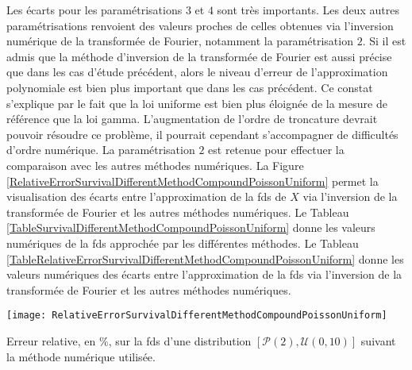 Les écarts pour les paramétrisations $3$ et $4$ sont très importants. Les deux autres paramétrisations renvoient des valeurs proches de celles obtenues via l\rq{}inversion numérique de la transformée de Fourier, notamment la paramétrisation $2$. Si il est admis que la méthode d\rq{}inversion de la transformée de Fourier est aussi précise que dans les cas d\rq{}étude précédent, alors le niveau d\rq{}erreur de l\rq{}approximation polynomiale est bien plus important que dans les cas précédent. Ce constat s\rq{}explique par le fait que la loi uniforme est bien plus éloignée de la mesure de référence que la loi gamma. L\rq{}augmentation de l\rq{}ordre de troncature devrait pouvoir résoudre ce problème, il pourrait cependant s\rq{}accompagner de difficultés d\rq{}ordre numérique. La paramétrisation $2$ est retenue pour effectuer la comparaison avec les autres méthodes numériques. La Figure \ref{RelativeErrorSurvivalDifferentMethodCompoundPoissonUniform} permet la visualisation des écarts entre l\rq{}approximation de la \gls{fds} de $X$ via l\rq{}inversion de la transformée de Fourier et les autres méthodes numériques. Le Tableau \ref{TableSurvivalDifferentMethodCompoundPoissonUniform} donne les valeurs numériques de la \gls{fds} approchée par les différentes méthodes. Le Tableau \ref{TableRelativeErrorSurvivalDifferentMethodCompoundPoissonUniform} donne les valeurs numériques des écarts entre l\rq{}approximation de la \gls{fds} via l\rq{}inversion de la transformée de Fourier et les autres méthodes numériques. 
\begin{figureth}			
\texttt{[image: RelativeErrorSurvivalDifferentMethodCompoundPoissonUniform]}
\caption{Erreur relative, en $\%$, sur la \gls{fds} d'une distribution $\left[\mathcal{P}(2),\mathcal{U}(0,10)\right]$ suivant la méthode numérique utilisée.}		
\label{RelativeErrorSurvivalDifferentMethodCompoundPoissonUniform}
	\end{figureth}

